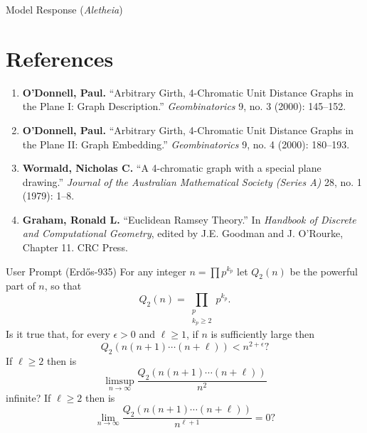\documentclass[11pt]{article}
\begin{document}
\begin{solution}{Model Response (\emph{Aletheia})}
\section*{References}
\begin{enumerate}
    \item \textbf{O'Donnell, Paul.} ``Arbitrary Girth, 4-Chromatic Unit Distance Graphs in the Plane I: Graph Description.'' \textit{Geombinatorics} 9, no. 3 (2000): 145–152.
    \item \textbf{O'Donnell, Paul.} ``Arbitrary Girth, 4-Chromatic Unit Distance Graphs in the Plane II: Graph Embedding.'' \textit{Geombinatorics} 9, no. 4 (2000): 180–193.
    \item \textbf{Wormald, Nicholas C.} ``A 4-chromatic graph with a special plane drawing.'' \textit{Journal of the Australian Mathematical Society (Series A)} 28, no. 1 (1979): 1–8.
    \item \textbf{Graham, Ronald L.} ``Euclidean Ramsey Theory.'' In \textit{Handbook of Discrete and Computational Geometry}, edited by J.E. Goodman and J. O'Rourke, Chapter 11. CRC Press.
\end{enumerate}
\end{solution}

\begin{problem}{User Prompt (Erd\H{o}s-935)}
For any integer $n=\prod p^{k_p}$ let $Q_2(n)$ be the powerful part of $n$, so that\[Q_2(n) = \prod_{\substack{p\\ k_p\geq 2}}p^{k_p}.\]Is it true that, for every $\epsilon>0$ and $\ell\geq 1$, if $n$ is sufficiently large then\[Q_2(n(n+1)\cdots(n+\ell))<n^{2+\epsilon}?\]If $\ell\geq 2$ then is\[\limsup_{n\to \infty}\frac{Q_2(n(n+1)\cdots(n+\ell))}{n^2}\]infinite? If $\ell\geq 2$ then is\[\lim_{n\to \infty}\frac{Q_2(n(n+1)\cdots(n+\ell))}{n^{\ell+1}}=0?\]
\end{problem}
\end{document}
